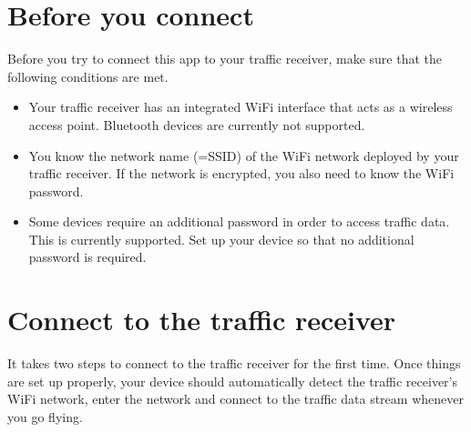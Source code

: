 \documentclass[letterpaper,10pt,english]{sphinxmanual}
\begin{document}
\section{Before you connect}
\label{\detokenize{02-steps/traffic:before-you-connect}}
\sphinxAtStartPar
Before you try to connect this app to your traffic receiver, make sure that the
following conditions are met.
\begin{itemize}
\item {} 
\sphinxAtStartPar
Your traffic receiver has an integrated Wi\sphinxhyphen{}Fi interface that acts as a
wireless access point. Bluetooth devices are currently not supported.

\item {} 
\sphinxAtStartPar
You know the network name (=SSID) of the Wi\sphinxhyphen{}Fi network deployed by your
traffic receiver. If the network is encrypted, you also need to know the Wi\sphinxhyphen{}Fi
password.

\item {} 
\sphinxAtStartPar
Some devices require an additional password in order to access traffic
data. This is currently  supported. Set up your device so that no
additional password is required.

\end{itemize}


\section{Connect to the traffic receiver}
\label{\detokenize{02-steps/traffic:connect-to-the-traffic-receiver}}
\sphinxAtStartPar
It takes two steps to connect  to the traffic
receiver for the first time. Once things are set up properly, your device should
automatically detect the traffic receiver’s Wi\sphinxhyphen{}Fi network, enter the network and
connect to the traffic data stream whenever you go flying.
\end{document}
